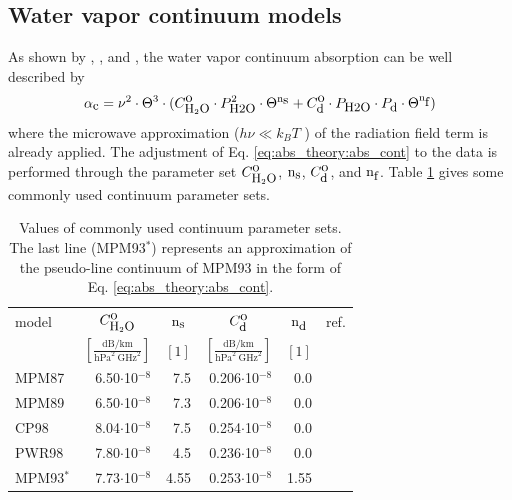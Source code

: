 \subsection{Water vapor continuum models}
\label{leveld:h2o_Cont}
As shown by \citet{liebeandlayton:87}, \citet{pwr:98}, and \citet{ma:90},
the water vapor continuum absorption can be well described by 
\begin{equation} 
  \label{eq:abs_theory:abs_cont}
  \alpha_{\mbox{\small c}} = \nu^2 \cdot \Theta^{3} \cdot 
            (C^{\mbox{\rm o}}_{\mbox{\rm \small H}_{2}\mbox{\rm \small O}} \cdot P_{\mbox{\rm \small H2O}}^2 \cdot \Theta^{{\rm n}_{\mbox{\rm \small s}}} + 
             C^{\mbox{\rm o}}_{\mbox{\rm \small d}} \cdot P_{\mbox{\rm \small H2O}} \cdot P_{\mbox{\rm \small d}} \cdot \Theta^{{\rm n}_{\mbox{\rm \small f}}})
\end{equation}
where the microwave approximation ($h\nu\ll k_BT$ ) of the radiation field term 
is already applied. The adjustment of Eq. \ref{eq:abs_theory:abs_cont} to the data 
is performed through the parameter set $C^{\mbox{\rm o}}_{\mbox{\rm \small H}_{2}\mbox{\rm \small O}}$, ${\rm n}_{\mbox{\rm \small s}}$, $C^{\mbox{\rm o}}_{\mbox{\rm \small d}}$, and ${\rm n}_{\mbox{\rm \small f}}$. 
Table \ref{tab:wvcontparam} gives some commonly used continuum parameter sets.
\begin{table}[!hbt]
  \begin{center}
  \begin{tabular}{lrrrrr}
    \hline
    model  & \multicolumn{1}{c}{$C^{\mbox{\rm o}}_{\mbox{\rm \small H}_{2}\mbox{\rm \small O}}$} & 
             \multicolumn{1}{c}{${\rm n}_{\mbox{\rm \small s}}$}  & 
             \multicolumn{1}{c}{$C^{\mbox{\rm o}}_{\mbox{\rm \small d}}$} & 
             \multicolumn{1}{c}{${\rm n}_{\mbox{\rm \small d}}$}  & 
             ref.\\
           & \multicolumn{1}{c}{$\left[\frac{\mbox{dB/km}}
                               {\mbox{hPa}^2~\mbox{GHz}^2}\right]$} & 
             \multicolumn{1}{c}{$[1]$} & 
             \multicolumn{1}{c}{$\left[\frac{\mbox{dB/km}}
                               {\mbox{hPa}^2~\mbox{GHz}^2}\right]$} & 
             \multicolumn{1}{c}{$[1]$} & \\
    \hline
    MPM87  & 6.50$\cdot$10$^{-8}$ & 7.5 & 0.206$\cdot$10$^{-8}$  &  0.0 & \citet{liebeandlayton:87}\\
    MPM89  & 6.50$\cdot$10$^{-8}$ & 7.3 & 0.206$\cdot$10$^{-8}$  &  0.0 & \citet{liebe:89}\\
    CP98   & 8.04$\cdot$10$^{-8}$ & 7.5 & 0.254$\cdot$10$^{-8}$  &  0.0 & \citet{cruzpol:98}\\ 
    PWR98  & 7.80$\cdot$10$^{-8}$ & 4.5 & 0.236$\cdot$10$^{-8}$  &  0.0 & \citet{pwr:98}\\
    \hline
    MPM93$^*$ & 7.73$\cdot$10$^{-8}$ & 4.55 & 0.253$\cdot$10$^{-8}$  & 1.55 & \citet{liebeetal:93}\\
    \hline
 \end{tabular}
\end{center}
 \caption[Liebe-type continuum model parameters.]{Values of commonly used continuum parameter sets. The last line (MPM93$^*$)
   represents an approximation of the pseudo-line continuum of MPM93
   in the form of Eq. \ref{eq:abs_theory:abs_cont}.}
 \label{tab:wvcontparam}
\end{table}

